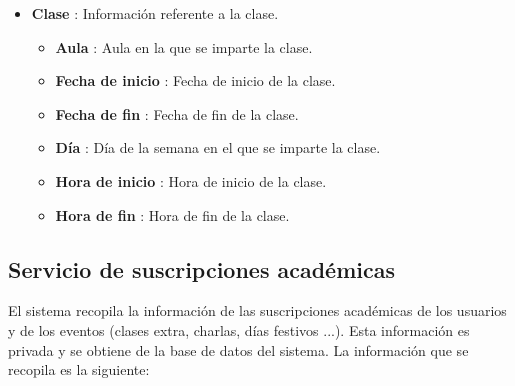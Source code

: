 \begin{itemize}
    \item \textbf{Clase} : Información referente a la clase.
    \begin{itemize}
        \item \textbf{Aula} : Aula en la que se imparte la clase.
        \item \textbf{Fecha de inicio} : Fecha de inicio de la clase.
        \item \textbf{Fecha de fin} : Fecha de fin de la clase.
        \item \textbf{Día} : Día de la semana en el que se imparte la clase.
        \item \textbf{Hora de inicio} : Hora de inicio de la clase.
        \item \textbf{Hora de fin} : Hora de fin de la clase.
    \end{itemize}
\end{itemize}

\subsection{Servicio de suscripciones académicas}

El sistema recopila la información de las suscripciones académicas de los usuarios y de los eventos (clases extra, charlas, días festivos ...). Esta información es privada y se obtiene de la base de datos del sistema. La información que se recopila es la siguiente:

